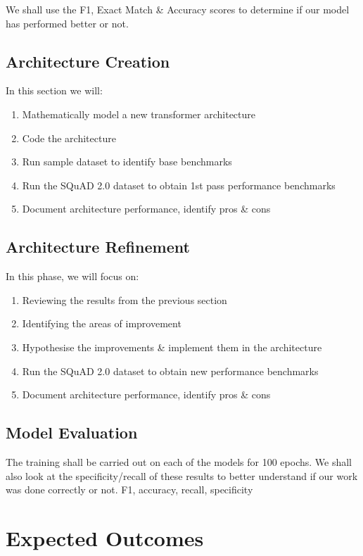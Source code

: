 \documentclass[11pt]{article}
\begin{document}
	We shall use the F1, Exact Match \& Accuracy scores to determine if our model has performed better or not.
	
	\subsection{Architecture Creation}\label{architecturecreation}
	In this section we will:
	
	\begin{enumerate}
		\item{Mathematically model a new transformer architecture}
		\item{Code the architecture}
		\item{Run sample dataset to identify base benchmarks}
		\item{Run the SQuAD 2.0 dataset\citep{dataset} to obtain 1st pass performance benchmarks}
		\item{Document architecture performance, identify pros \& cons}
	\end{enumerate}
	\subsection{Architecture Refinement}\label{refinement}
	In this phase, we will focus on:
	\begin{enumerate}
		\item{Reviewing the results from the previous section}
		\item{Identifying the areas of improvement}
		\item{Hypothesise the improvements \& implement them in the architecture}
		\item{Run the SQuAD 2.0 dataset\citep{dataset} to obtain new performance benchmarks}
		\item{Document architecture performance, identify pros \& cons}
	\end{enumerate}
	\subsection{Model Evaluation}
	The training shall be carried out on each of the models for 100 epochs. We shall also look at the specificity/recall of these results to better understand if our work was done correctly or not. F1, accuracy, recall, specificity
	\section{Expected Outcomes}\label{expectedoutcomes}
	
\end{document}
